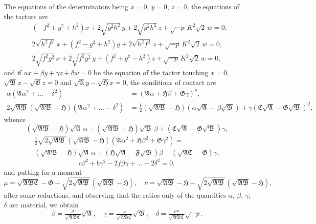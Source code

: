 \documentclass[11pt]{article}
\begin{document}
The equations of the determinators being $x=0$, $y=0$, $z=0$, the equations of the tactors are
\begin{align*}
&(-f^2+g^2+h^2)x + 2\sqrt{g^2h^2}\,y + 2\sqrt{g^2h^2}\,z + \sqrt{-p}\,K^2\sqrt{2}\,w = 0,\\
&2\sqrt{h^2f^2}\,x + (f^2-g^2+h^2)y + 2\sqrt{h^2f^2}\,z + \sqrt{-p}\,K^2\sqrt{2}\,w = 0,\\
&2\sqrt{f^2g^2}\,x + 2\sqrt{f^2g^2}\,y + (f^2+g^2-h^2)z + \sqrt{-p}\,K^2\sqrt{2}\,w = 0,
\end{align*}
and if $\alpha x+\beta y+\gamma z+\delta w=0$ be the equation of the tactor touching $x=0$, $\sqrt{\mathfrak{B}}x-\sqrt{\mathfrak{G}}z=0$ and $\sqrt{\mathfrak{A}}y-\sqrt{\mathfrak{H}}x=0$, the conditions of contact are
\begin{align*}
\alpha(\mathfrak{A}\alpha^2+\ldots-\delta^2) &= (\mathfrak{A}\alpha+\mathfrak{H}\beta+\mathfrak{G}\gamma)^2,\\
2\sqrt{\mathfrak{A}\mathfrak{B}}(\sqrt{\mathfrak{A}\mathfrak{B}}-\mathfrak{H})(\mathfrak{A}\alpha^2+\ldots-\delta^2) &= \tfrac{1}{2}(\sqrt{\mathfrak{A}\mathfrak{B}}-\mathfrak{H})(\alpha\sqrt{\mathfrak{A}}-\beta\sqrt{\mathfrak{B}})+\gamma(\mathfrak{C}\sqrt{\mathfrak{A}}-\mathfrak{G}\sqrt{\mathfrak{B}})^2,
\end{align*}
whence
\[
(\sqrt{\mathfrak{A}\mathfrak{B}}-\mathfrak{H})\sqrt{\mathfrak{A}}\,\alpha - (\sqrt{\mathfrak{A}\mathfrak{B}}-\mathfrak{H})\sqrt{\mathfrak{B}}\,\beta + (\mathfrak{C}\sqrt{\mathfrak{A}}-\mathfrak{G}\sqrt{\mathfrak{B}})\gamma,
\]
\begin{multline*}
\tfrac{1}{2}\sqrt{2\sqrt{\mathfrak{A}\mathfrak{B}}}(\sqrt{\mathfrak{A}\mathfrak{B}}-\mathfrak{H})(\mathfrak{A}\alpha^2+\mathfrak{H}\beta^2+\mathfrak{G}\gamma^2) =\\
(\sqrt{\mathfrak{A}\mathfrak{B}}-\mathfrak{H})\sqrt{\mathfrak{A}}\,\alpha + (\mathfrak{H}\sqrt{\mathfrak{A}}-\mathfrak{F}\sqrt{\mathfrak{B}})\beta - (\sqrt{\mathfrak{A}\mathfrak{C}}-\mathfrak{G})\gamma,
\end{multline*}
\[
c\beta^2+b\gamma^2-2f\beta\gamma+\ldots-2\delta^2=0,
\]
and putting for a moment
\[
\mu = \sqrt{\mathfrak{A}\mathfrak{B}\mathfrak{C}}-\mathfrak{G}-\sqrt{2\sqrt{\mathfrak{A}\mathfrak{B}}}(\sqrt{\mathfrak{A}\mathfrak{B}}-\mathfrak{H}), \quad \nu = \sqrt{\mathfrak{A}\mathfrak{B}}-\mathfrak{H}-\sqrt{2\sqrt{\mathfrak{A}\mathfrak{B}}}(\sqrt{\mathfrak{A}\mathfrak{B}}-\mathfrak{H}),
\]
after some reductions, and observing that the ratios only of the quantities $\alpha$, $\beta$, $\gamma$, $\delta$ are material, we obtain
\[
\beta = \tfrac{\mu}{\sqrt{\mathfrak{A}\mathfrak{B}\mathfrak{C}}}\sqrt{\mathfrak{A}}, \quad \gamma = \tfrac{\nu}{\sqrt{\mathfrak{A}\mathfrak{B}\mathfrak{C}}}\sqrt{\mathfrak{B}}, \quad \delta = \tfrac{\mu\nu}{\sqrt{\mathfrak{A}\mathfrak{B}\mathfrak{C}}}\sqrt{-p}.
\]
\end{document}
